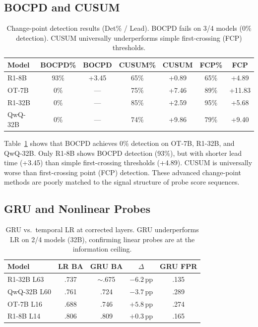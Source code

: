 \documentclass[11pt]{article}
\newcommand{\pp}{\,\text{pp}}
\begin{document}
\subsection{BOCPD and CUSUM}
\label{sec:bocpd}

\begin{table}[t]
\centering
\small
\begin{tabular}{@{}lcccccc@{}}
\toprule
\textbf{Model} & \textbf{BOCPD\%} & \textbf{BOCPD} & \textbf{CUSUM\%} & \textbf{CUSUM} & \textbf{FCP\%} & \textbf{FCP} \\
\midrule
R1-8B & 93\% & +3.45 & 65\% & +0.89 & 65\% & +4.89 \\
OT-7B & 0\% & --- & 75\% & +7.46 & 89\% & +11.83 \\
R1-32B & 0\% & --- & 85\% & +2.59 & 95\% & +5.68 \\
QwQ-32B & 0\% & --- & 74\% & +9.86 & 79\% & +9.40 \\
\bottomrule
\end{tabular}
\caption{Change-point detection results (Det\% / Lead). BOCPD fails on 3/4 models (0\% detection). CUSUM universally underperforms simple first-crossing (FCP) thresholds.}
\label{tab:bocpd}
\end{table}

Table~\ref{tab:bocpd} shows that BOCPD achieves 0\% detection on OT-7B, R1-32B, and QwQ-32B.
Only R1-8B shows BOCPD detection (93\%), but with shorter lead time (+3.45) than simple first-crossing thresholds (+4.89).
CUSUM is universally worse than first-crossing point (FCP) detection.
These advanced change-point methods are poorly matched to the signal structure of probe score sequences.

\subsection{GRU and Nonlinear Probes}
\label{sec:gru}

\begin{table}[t]
\centering
\small
\begin{tabular}{@{}lcccc@{}}
\toprule
\textbf{Model} & \textbf{LR BA} & \textbf{GRU BA} & \textbf{$\Delta$} & \textbf{GRU FPR} \\
\midrule
R1-32B L63 & .737 & $\sim$.675 & $-6.2\pp$ & .135 \\
QwQ-32B L60 & .761 & .724 & $-3.7\pp$ & .289 \\
OT-7B L16 & .688 & .746 & $+5.8\pp$ & .274 \\
R1-8B L14 & .806 & .809 & $+0.3\pp$ & .165 \\
\bottomrule
\end{tabular}
\caption{GRU vs.\ temporal LR at corrected layers. GRU underperforms LR on 2/4 models (32B), confirming linear probes are at the information ceiling.}
\label{tab:gru}
\end{table}
\end{document}
